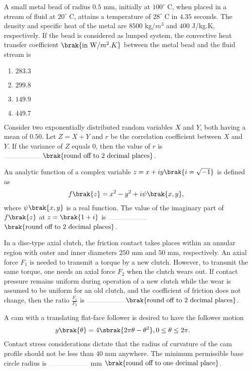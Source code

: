 \item A small metal bead of radius $0.5$ mm, initially at $100^\circ$ C, when placed in a stream of fluid at $20^\circ$ C, attains a temperature of $28^\circ$ C in $4.35$ seconds. The density and specific heat of the metal are $8500$ kg/$m^3$ and $400$ J/kg.K, respectively. If the bead is considered as lumped system, the convective heat transfer coefficient $\brak{\text{in W}/m^2 .K}$ between the metal bead and the fluid stream is
\hfill{}
\begin{enumerate}
\item $283.3$
\item $299.8$
\item $149.9$
\item $449.7$
\end{enumerate}

\item Consider two exponentially distributed random variables $X$ and $Y$, both having a mean of $0.50$. Let $Z=X+Y$ and $r$ be the correlation coefficient between $X$ and $Y$. If the variance of $Z$ equals $0$, then the value of $r$ is $\rule{2cm}{0.1pt}\brak{\text{round off to 2 decimal places}}$.
\hfill{}

\item An analytic function of a complex variable $z = x + iy \brak{i=\sqrt{-1}}$ is defined as
\begin{align*}
f\brak{z} = x^2 - y^2 + i\psi\brak{x,y},
\end{align*}
where $\psi\brak{x,y}$ is a real function. The value of the imaginary part of $f\brak{z}$ at $z=\brak{1+i}$ is $\rule{2cm}{0.1pt}$ $\brak{\text{round off to 2 decimal places}}$.
\hfill{}

\item In a disc-type axial clutch, the friction contact takes places within an annular region with outer and inner diameters $250$ mm and $50$ mm, respectively. An axial force $F_1$ is needed to transmit a torque by a new clutch. However, to transmit the same torque, one needs an axial force $F_2$ when the clutch wears out. If contact pressure remains uniform during operation of a new clutch while the wear is assumed to be uniform for an old clutch, and the coefficient of friction does not change, then the ratio $\frac{F_1}{F_2}$ is $\rule{2cm}{0.1pt}\brak{\text{round off to 2 decimal places}}$.
\hfill{}

\item A cam with a translating flat-face follower is desired to have the follower motion
\begin{align*}
y\brak{\theta} = 4\sbrak{2\pi\theta - \theta^2} &, 0 \leq \theta \leq 2\pi.
\end{align*}
Contact stress considerations dictate that the radius of curvature of the cam profile should not be less than $40$ mm anywhere. The minimum permissible base circle radius is $\rule{2cm}{0.1pt}$ mm $\brak{\text{round off to one decimal place}}$.
\hfill{}

